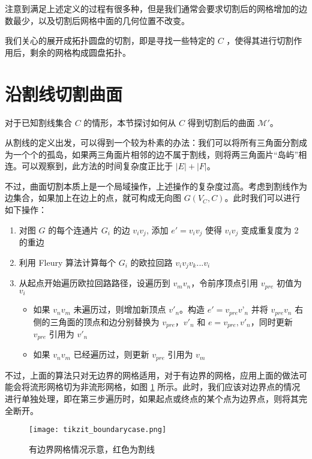 注意到满足上述定义的过程有很多种，但是我们通常会要求切割后的网格增加的边数最少，以及切割后网格中面的几何位置不改变。

我们关心的展开成拓扑圆盘的切割，即是寻找一些特定的 $ C $ ，使得其进行切割作用后，剩余的网格构成圆盘拓扑。

\section{沿割线切割曲面}

对于已知割线集合 $ C $ 的情形，本节探讨如何从 $ C $ 得到切割后的曲面 $ \mathcal M' $。

从割线的定义出发，可以得到一个较为朴素的办法：我们可以将所有三角面分割成为一个个的孤岛，如果两三角面片相邻的边不属于割线，则将两三角面片“岛屿”相连。可以观察到，此方法的时间复杂度正比于 $ | E | + | F | $。

不过，曲面切割本质上是一个局域操作，上述操作的复杂度过高。考虑到割线作为边集合，如果加上在边上的点，就可构成无向图 $ G(V_C, C) $。此时我们可以进行如下操作：
\begin{enumerate}
  \item 对图 $ G $ 的每个连通片 $ G_i $ 的边 $ v_iv_j $, 添加 $ e' = v_i v_j $ 使得 $ v_i v_j $ 变成重复度为 2 的重边
  \item 利用 Fleury 算法计算每个 $ G_i $ 的欧拉回路 $ v_i v_j v_k ... v_i $
  \item 从起点开始遍历欧拉回路路径，设遍历到 $ v_m v_n $，令前序顶点引用 $ v_{pre} $ 初值为 $ v_i $
        \begin{itemize}
          \item 如果 $ v_n v_m $ 未遍历过，则增加新顶点 $ v'_n $。构造 $ e' = v_{pre} v’_n $ 并将 $ v_{pre} v_n $ 右侧的三角面的顶点和边分别替换为 $ v_{pre} $，$ v'_n $ 和 $ e = v_{pre}, v'_n $，同时更新 $ v_{pre} $ 引用为 $ v'_n $
          \item 如果 $ v_n v_m $ 已经遍历过，则更新 $ v_{pre} $ 引用为 $ v_m $
        \end{itemize}
\end{enumerate}

不过，上面的算法只对无边界的网格适用，对于有边界的网格，应用上面的做法可能会将流形网格切为非流形网格，如图 \ref{fig:meshboundarycase} 所示。此时，我们应该对边界点的情况进行单独处理，即在第三步遍历时，如果起点或终点的某个点为边界点，则将其完全断开。

\begin{figure}[h]
  \centering
  \texttt{[image: tikzit\_boundarycase.png]}
  \caption{有边界网格情况示意，红色为割线}
  \label{fig:meshboundarycase}
\end{figure}

